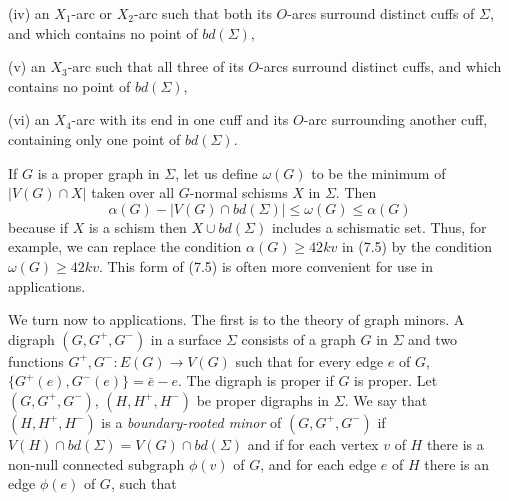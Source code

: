 \hspace*{12pt}(iv) an $X_1$-arc or $X_2$-arc such that both its $O$-arcs surround distinct cuffs of $\Sigma$, and which contains no point of $bd(\Sigma)$,

\hspace*{12pt}(v) an $X_3$-arc such that all three of its $O$-arcs surround distinct cuffs, and which contains no point of $bd(\Sigma)$,

\hspace*{12pt}(vi) an $X_4$-arc with its end in one cuff and its $O$-arc surrounding another cuff, containing only one point of $bd(\Sigma)$.

If $G$ is a proper graph in $\Sigma$, let us define $\omega(G)$ to be the minimum of $|V(G) \cap X|$ taken over all $G$-normal schisms $X$ in $\Sigma$. Then
\begin{equation*}
\alpha(G) - |V(G) \cap bd(\Sigma)| \le \omega(G) \le \alpha(G)
\end{equation*}
because if $X$ is a schism then $X \cup bd(\Sigma)$ includes a schismatic set. Thus, for example, we can replace the condition $\alpha(G) \ge 42kv$ in (7.5) by the condition $\omega(G) \ge 42kv$. This form of (7.5) is often more convenient for use in applications.


We turn now to applications. The first is to the theory of graph minors. A digraph $(G, G^+, G^-)$ in a surface $\Sigma$ consists of a graph $G$ in $\Sigma$ and two functions $G^+, G^- \colon E(G) \to V(G)$ such that for every edge $e$ of $G$, $\{G^+(e), G^-(e)\} = \bar{e} - e$. The digraph is proper if $G$ is proper. Let $(G, G^+, G^-)$, $(H, H^+, H^-)$ be proper digraphs in $\Sigma$. We say that $(H, H^+, H^-)$ is a \textit{boundary-rooted minor} of $(G, G^+, G^-)$ if $V(H) \cap bd(\Sigma) = V(G) \cap bd(\Sigma)$ and if for each vertex $v$ of $H$ there is a non-null connected subgraph $\phi(v)$ of $G$, and for each edge $e$ of $H$ there is an edge $\phi(e)$ of $G$, such that

